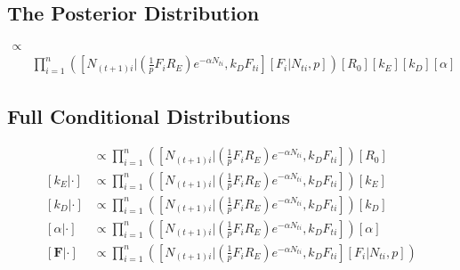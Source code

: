\documentclass{article}[12pt]
\begin{document}
\subsection*{The Posterior Distribution}
\begin{align*}
[R_0, k_E, k_D, \alpha , \boldsymbol{F} | \boldsymbol{N_t}, \boldsymbol{N_{t+1}}] \propto & \\ 
& \prod_{i=1}^{n}\left([N_{(t+1)i}|\left(\frac{1}{p}F_iR_E\right)e^{-\alpha N_{ti}}, k_DF_{ti}][F_i|N_{ti},p]\right)[R_0][k_E][k_D][\alpha]
\end{align*}

\subsection*{Full Conditional Distributions}
\begin{align*}
[R_0|\cdot] & \propto \prod_{i=1}^{n}\left([N_{(t+1)i}|\left(\frac{1}{p}F_iR_E\right)e^{-\alpha N_{ti}}, k_DF_{ti}]\right)[R_0] \\
[k_E|\cdot] & \propto \prod_{i=1}^{n}\left([N_{(t+1)i}|\left(\frac{1}{p}F_iR_E\right)e^{-\alpha N_{ti}}, k_DF_{ti}]\right)[k_E] \\
[k_D|\cdot] & \propto \prod_{i=1}^{n}\left([N_{(t+1)i}|\left(\frac{1}{p}F_iR_E\right)e^{-\alpha N_{ti}}, k_DF_{ti}]\right)[k_D] \\
[\alpha | \cdot] & \propto \prod_{i=1}^{n}\left([N_{(t+1)i}|\left(\frac{1}{p}F_iR_E\right)e^{-\alpha N_{ti}}, k_DF_{ti}]\right)[\alpha] \\
[\boldsymbol{F}|\cdot] & \propto \prod_{i=1}^{n}\left([N_{(t+1)i}|\left(\frac{1}{p}F_iR_E\right)e^{-\alpha N_{ti}}, k_DF_{ti}][F_i|N_{ti},p]\right)
\end{align*}


\end{document}
